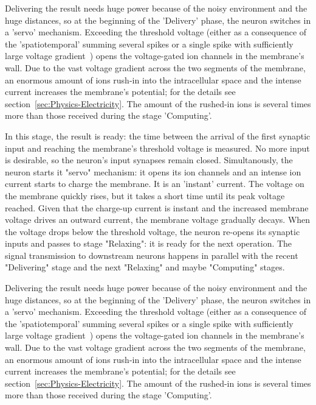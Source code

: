 Delivering the result needs huge power because of the noisy environment and 
the huge distances, so at the beginning of the 'Delivery' phase,
the neuron switches in a 'servo' mechanism. Exceeding the threshold voltage
(either as a consequence of the 'spatiotemporal' summing several spikes or a single spike with sufficiently large voltage gradient~\cite{LosonczyIntegrative:2006}) opens the voltage-gated ion channels in the membrane's wall. 
Due to the
vast voltage gradient across the two segments of the membrane, an enormous 
amount of ions rush-in into the intracellular space and the intense current
increases the membrane's potential; for the details see section~\ref{sec:Physics-Electricity}. The amount of the rushed-in ions
is several times more than those received during the stage 'Computing'.

\else

In this stage,
the result is ready: the time between the arrival of the first
synaptic input and reaching the membrane's threshold voltage is measured.
No more input is desirable, so the neuron's input synapses remain closed.
Simultanously, the neuron starts it "servo" mechanism: it opens its ion channels
and an intense ion current starts to charge the membrane. 
It is an 'instant' current.
The voltage on the membrane quickly rises, but it takes a short time
until its peak voltage reached.
Given that the charge-up current is instant and the increased
membrane voltage drives an outward current, the membrane voltage
gradually decays.
When the voltage drops below the threshold voltage, the neuron re-opens its synaptic inputs and passes to stage "Relaxing": it is ready for the next operation. The signal transmission to downstream neurons
happens in parallel with the recent "Delivering" stage and
the next "Relaxing" and maybe "Computing" stages. 

Delivering the result needs huge power because of the noisy environment and 
the huge distances, so at the beginning of the 'Delivery' phase,
the neuron switches in a 'servo' mechanism. Exceeding the threshold voltage
(either as a consequence of the 'spatiotemporal' summing several spikes or a single spike with sufficiently large voltage gradient~\cite{LosonczyIntegrative:2006}) opens the voltage-gated ion channels in the membrane's wall. 
Due to the
vast voltage gradient across the two segments of the membrane, an enormous 
amount of ions rush-in into the intracellular space and the intense current
increases the membrane's potential; for the details see section~\ref{sec:Physics-Electricity}. The amount of the rushed-in ions
is several times more than those received during the stage 'Computing'.

